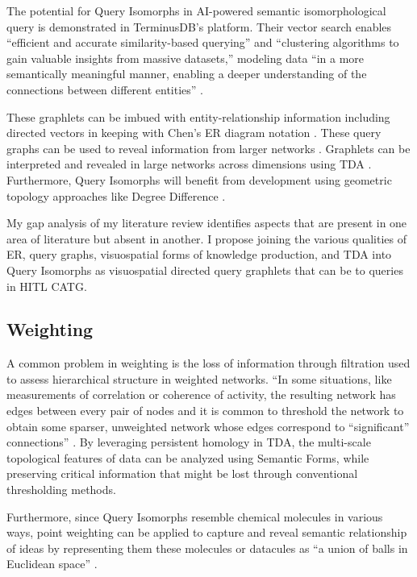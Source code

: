 The potential for Query Isomorphs in AI-powered semantic isomorphological query is demonstrated in TerminusDB’s platform. Their vector search enables “efficient and accurate similarity-based querying” and “clustering algorithms to gain valuable insights from massive datasets,” modeling data “in a more semantically meaningful manner, enabling a deeper understanding of the connections between different entities” \citep{terminusdb_enterprise_2023}.

These graphlets can be imbued with entity-relationship information including directed vectors in keeping with Chen’s ER diagram notation \citep{chen_entity_1976,rodina_chen_2024}. These query graphs can be used to reveal information from larger networks \citep[p. 313]{sowa_conceptual_1984}. Graphlets can be interpreted and revealed in large networks across dimensions using TDA \citep[p. 1]{aktas_persistence_2019}. Furthermore, Query Isomorphs will benefit from development using geometric topology approaches like Degree Difference \citep{farzam_degree_2020}.

My gap analysis of my literature review identifies aspects that are present in one area of literature but absent in another. I propose joining the various qualities of ER, query graphs, visuospatial forms of knowledge production, and TDA into Query Isomorphs as visuospatial directed query graphlets that can be to queries in HITL CATG. 


\subsection{Weighting}

A common problem in weighting is the loss of information through filtration used to assess hierarchical structure in weighted networks. “In some situations, like measurements of correlation or coherence of activity, the resulting network has edges between every pair of nodes and it is common to threshold the network to obtain some sparser, unweighted network whose edges correspond to “significant” connections” \citep[p. 11]{giusti_twos_2016}. By leveraging persistent homology \citep[p. 11]{giusti_twos_2016} in TDA, the multi-scale topological features of data can be analyzed using Semantic Forms, while preserving critical information that might be lost through conventional thresholding methods. 

Furthermore, since Query Isomorphs resemble chemical molecules in various ways, point weighting can be applied to capture and reveal semantic relationship of ideas by representing them these molecules or datacules as “a union of balls in Euclidean space” \citep[p. 14]{otter_roadmap_2017}. 

